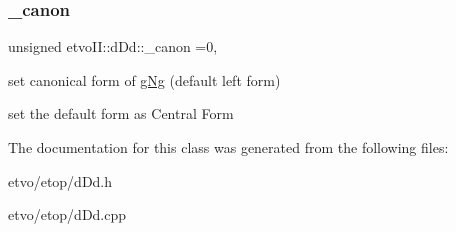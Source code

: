 \subsubsection{\texorpdfstring{\+\_\+canon}{\_canon}}
{\footnotesize\ttfamily unsigned etvo\+I\+I\+::d\+Dd\+::\+\_\+canon =0\hspace{0.3cm}{\ttfamily [static]}, {\ttfamily [protected]}}



set canonical form of \mbox{\hyperlink{classetvo_i_i_1_1g_ng}{g\+Ng}} (default left form) 

set the default form as Central Form 

The documentation for this class was generated from the following files\+:\begin{DoxyCompactItemize}
\item 
etvo/etop/d\+Dd.\+h\item 
etvo/etop/d\+Dd.\+cpp\end{DoxyCompactItemize}
